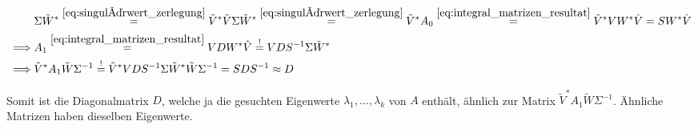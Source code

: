 \begin{align*}
    &
    \Sigma \tilde W^\ast
    \stackrel
    {
        \eqref{eq:singulärwert_zerlegung}
    }{=}
    \tilde V^\ast \tilde V \Sigma \tilde W^\ast
    \stackrel
    {
        \eqref{eq:singulärwert_zerlegung}
    }{=}
    \tilde V^\ast A_0
    \stackrel
    {
        \eqref{eq:integral_matrizen_resultat}
    }{=}
    \tilde V^\ast V W^\ast \hat V
    =
    S W^\ast \hat V \\
    \implies &
    A_1
    \stackrel
    {
        \eqref{eq:integral_matrizen_resultat}
    }{=}
    V D W^\ast \hat V
    \stackrel{!}{=}
    V D S^{-1} \Sigma \tilde W^\ast \\
    \implies &
    \tilde V^\ast A_1 \tilde W \Sigma^{-1}
    \stackrel{!}{=}
    \tilde V^\ast V D S^{-1} \Sigma \tilde W^\ast \tilde W \Sigma^{-1}
    =
    S D S^{-1}
    \approx
    D
\end{align*}

Somit ist die Diagonalmatrix $D$, welche ja die gesuchten Eigenwerte $\lambda_1, \dots, \lambda_k$ von $A$ enthält, ähnlich zur Matrix $\tilde V^\ast A_1 \tilde W \Sigma^{-1}$.
Ähnliche Matrizen haben dieselben Eigenwerte.